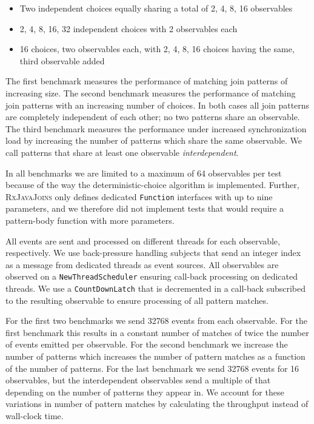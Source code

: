 \documentclass[runningheads]{llncs}
\begin{document}
\begin{sloppypar}
\begin{itemize}
\item Two independent choices equally sharing a total of 2, 4, 8, 16 observables
\item 2, 4, 8, 16, 32 independent choices with 2 observables each 
\item 16 choices, two observables each, with 2, 4, 8, 16 choices having the same, third observable added
\end{itemize}
\noindent
The first benchmark measures the performance of matching join patterns of
increasing size. The second benchmark measures the performance of matching
join patterns with an increasing number of choices. In both cases all join
patterns are completely independent of each other; no two patterns share an
observable. The third benchmark measures the performance under increased
synchronization load by increasing the number of patterns which share the same
observable. We call patterns that share at least one observable
\emph{interdependent}.

In all benchmarks we are limited to a maximum of 64 observables per test
because of the way the deterministic-choice algorithm is implemented. Further,
\textsc{RxJavaJoins} only defines dedicated \texttt{Function} interfaces with
up to nine parameters, and we therefore did not implement tests that would
require a pattern-body function with more parameters.

All events are sent and processed on different threads for each observable,
respectively. We use back-pressure handling subjects that send an integer
index as a message from dedicated threads as event sources. All observables
are observed on a \texttt{NewThreadScheduler} ensuring call-back processing on
dedicated threads. We use a \texttt{CountDownLatch} that is decremented in a
call-back subscribed to the resulting observable to ensure processing of all
pattern matches.

For the first two benchmarks we send 32768 events from each observable. For
the first benchmark this results in a constant number of matches of twice the
number of events emitted per observable. For the second benchmark we increase
the number of patterns which increases the number of pattern matches as a
function of the number of patterns. For the last benchmark we send 32768 events
for 16 observables, but the interdependent observables send a multiple of that
depending on the number of patterns they appear in. We account for these
variations in number of pattern matches by calculating the throughput instead
of wall-clock time.


\end{sloppypar}
\end{document}
